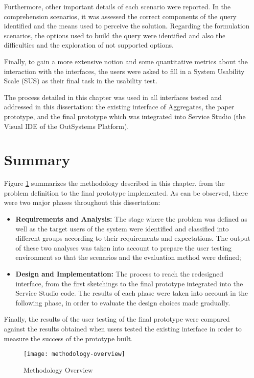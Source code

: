 Furthermore, other important details of each scenario were reported. In the comprehension scenarios, it was assessed the correct components of the query identified and the means used to perceive the solution. Regarding the formulation scenarios, the options used to build the query were identified and also the difficulties and the exploration of not supported options.

Finally, to gain a more extensive notion and some quantitative metrics about the interaction with the interfaces, the users were asked to fill in a System Usability Scale (SUS) \cite{system_usability_scale} as their final task in the usability test.

The process detailed in this chapter was used in all interfaces tested and addressed in this dissertation: the existing interface of Aggregates, the paper prototype, and the final prototype which was integrated into Service Studio (the Visual \gls{IDE} of the OutSystems Platform). 

\section{Summary}
\label{sec:summary}
Figure \ref{fig:methodologyOverview} summarizes the methodology described in this chapter, from the problem definition to the final prototype implemented. As can be observed, there were two major phases throughout this dissertation:

\begin{itemize}
    \item \textbf{Requirements and Analysis: } The stage where the problem was defined as well as the target users of the system were identified and classified into different groups according to their requirements and expectations. The output of these two analyses was taken into account to prepare the user testing environment so that the scenarios and the evaluation method were defined;
    \item \textbf{Design and Implementation: } The process to reach the redesigned interface, from the first sketchings to the final prototype integrated into the Service Studio code. The results of each phase were taken into account in the following phase, in order to evaluate the design choices made gradually.
\end{itemize}

Finally, the results of the user testing of the final prototype were compared against the results obtained when users tested the existing interface in order to measure the success of the prototype built.

\begin{figure}[htbp]
	\centering
	\texttt{[image: methodology-overview]}
	\caption{Methodology Overview}
	\label{fig:methodologyOverview}
\end{figure}